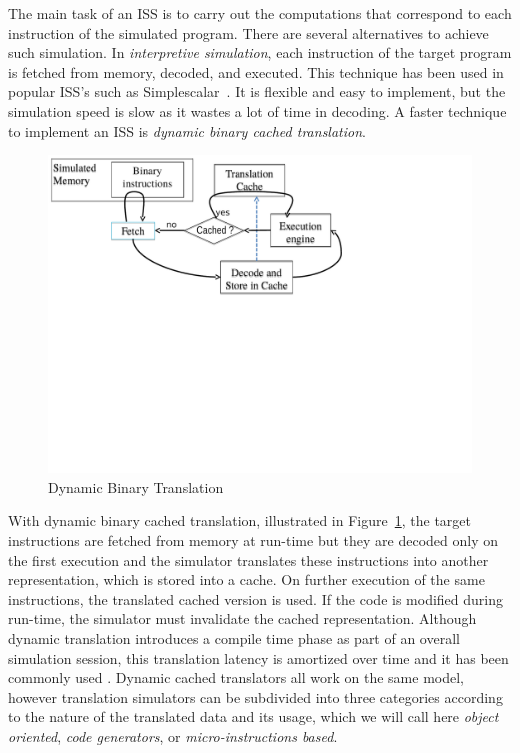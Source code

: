\documentclass{llncs}
\begin{document}
The main task of an ISS is to carry out the computations that
correspond to each instruction of the simulated program. There are
several alternatives to achieve such simulation. In {\em interpretive
  simulation}, each instruction of the target program is fetched from
memory, decoded, and executed. This technique has been used in popular
ISS's such as Simplescalar~\cite{simplescalar-1997}. It is flexible
and easy to implement, but the simulation speed is slow as it wastes a
lot of time in decoding. A faster technique to implement an ISS is
{\em dynamic binary cached translation}.
\begin{figure}[th]
  \centering
\includegraphics[scale=0.5, trim= 0mm 105mm 25mm 2mm, clip=true]
{fig/dyntrans.pdf}
  \caption{Dynamic Binary Translation}
  \label{fig:iss}
\end{figure}
With dynamic binary cached translation, illustrated in
Figure~\ref{fig:iss}, the target instructions are fetched from memory
at run-time but they are decoded only on the first execution and the
simulator translates these instructions into another representation,
which is stored into a cache. On further execution of the same
instructions, the translated cached version is used. If the code is
modified during run-time, the simulator must invalidate the cached
representation.  Although dynamic translation introduces a compile
time phase as part of an overall simulation session, this translation
latency is amortized over time and it has been commonly used
\cite{shade-cmelik-keppel,embra-witchell-rosenblum,reshadi-mishra-dynamicISS,scott-kumar-retargetable,vala-duesterwald-dynamo}.
Dynamic cached translators all work on the same model, however
translation simulators can be subdivided into three categories
according to the nature of the translated data and its usage, which we
will call here \textit{object oriented}, \textit{code generators}, or
\textit{micro-instructions based}.
\end{document}
